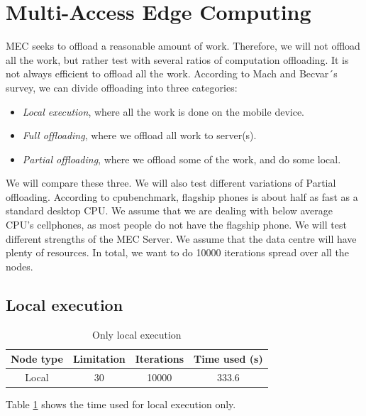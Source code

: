 \section{Multi-Access Edge Computing}
MEC seeks to offload a reasonable amount of work. Therefore, we will not offload all the work, but rather test with several ratios of computation offloading. It is not always efficient to offload all the work. According to Mach and Becvar´s survey\cite{mach_mobile_2017}, we can divide offloading into three categories:
\begin{itemize}
    \item \textit{Local execution}, where all the work is done on the mobile device.
    \item \textit{Full offloading}, where we offload all work to server(s).
    \item \textit{Partial offloading}, where we offload some of the work, and do some local.
\end{itemize}
We will compare these three. We will also test different variations of Partial offloading. According to cpubenchmark\cite{noauthor_passmark_nodate}, flagship phones is about half as fast as a standard desktop CPU. We assume that we are dealing with below average CPU's cellphones, as most people do not have the flagship phone. We will test different strengths of the MEC Server. We assume that the data centre will have plenty of resources. In total, we want to do 10000 iterations spread over all the nodes.

\subsection{Local execution}
\begin{table}[h!]
    \centering
    \begin{tabular}[c]{|c|c|c|c|}
        \hline
        Node type & Limitation & Iterations & Time used (s) \\
        \hline
        \hline
        Local & 30 & 10000 & 333.6 \\
        \hline
    \end{tabular}
    \caption{Only local execution}
    \label{tab:MEC_local_execution}
\end{table}
Table \ref{tab:MEC_local_execution} shows the time used for local execution only.



